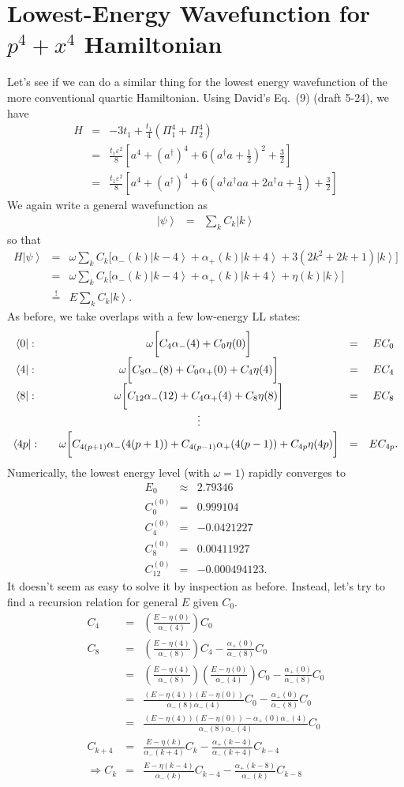 \documentclass[a4paper, 10pt]{paper}
\newcommand{\be}{\begin{eqnarray*}}
\newcommand{\ee}{\end{eqnarray*}}
\newcommand{\ket}[1]{\left|{#1}\right\rangle}
\newcommand{\bra}[1]{\left\langle{#1}\right|}
\begin{document}
\section{Lowest-Energy Wavefunction for $p^4+x^4$ Hamiltonian}
Let's see if we can do a similar thing for the lowest energy wavefunction of the more conventional quartic Hamiltonian. Using David's Eq.~(9) (draft 5-24), we have
\be
H&=&-3t_1+\frac{t_1}{4}\left(\Pi_1^4+\Pi_2^4\right)\\
&=&\frac{t_1\varepsilon^2}{8}\left[a^4+\left(a^\dagger\right)^4+6\left(a^\dagger a+\frac{1}{2}\right)^2+\frac{3}{2}\right]\\
&=&\frac{t_1\varepsilon^2}{8}\left[a^4+\left(a^\dagger\right)^4+6\left(a^\dagger a^\dagger a a +2a^\dagger a+\frac{1}{4}\right)+\frac{3}{2}\right]
\ee
We again write a general wavefunction as
\be
\ket{\psi}&=&\sum_kC_k\ket{k}
\ee
so that
\be
H\ket{\psi}&=&\omega\sum_{k}C_k\bigg[\alpha_-(k)\ket{k-4}+\alpha_+(k)\ket{k+4}+3\left(2k^2+2k+1\right)\ket{k}\bigg]\\
&=&\omega\sum_{k}C_k\bigg[\alpha_-(k)\ket{k-4}+\alpha_+(k)\ket{k+4}+\eta(k)\ket{k}\bigg]\\
&\stackrel{!}{=}&E\sum_kC_k\ket{k}.
\ee
As before, we take overlaps with a few low-energy LL states:
\be
\renewcommand\arraystretch{1.5}\begin{array}{ccccc}
\bra{0}:&&\omega\bigg[C_{4}\alpha_-(4)+C_{0}\eta(0)\bigg]&=&EC_0\\
\bra{4}:&&\omega\bigg[C_{8}\alpha_-(8)+C_{0}\alpha_+(0)+C_{4}\eta(4)\bigg]&=&EC_4\\
\bra{8}:&&\omega\bigg[C_{12}\alpha_-(12)+C_{4}\alpha_+(4)+C_{8}\eta(8)\bigg]&=&EC_8\\
&&\vdots && \\
\bra{4p}:&&\omega\bigg[C_{4(p+1)}\alpha_-(4(p+1))+C_{4(p-1)}\alpha_+(4(p-1))+C_{4p}\eta(4p)\bigg]&=&EC_{4p}.
\end{array}
\ee
Numerically, the lowest energy level (with $\omega=1$) rapidly converges to
\be
E_0&\approx&2.79346\\
C^{(0)}_0&=&0.999104\\
C^{(0)}_4&=&-0.0421227\\
C^{(0)}_8&=&0.00411927\\
C^{(0)}_12&=&-0.000494123.
\ee
It doesn't seem as easy to solve it by inspection as before. Instead, let's try to find a recursion relation for general $E$ given $C_0$.
\be
C_4&=&\left(\frac{E-\eta(0)}{\alpha_-(4)}\right)C_0\\
C_8&=&\left(\frac{E-\eta(4)}{\alpha_-(8)}\right)C_4-\frac{\alpha_+(0)}{\alpha_-(8)}C_0\\
&=&\left(\frac{E-\eta(4)}{\alpha_-(8)}\right)\left(\frac{E-\eta(0)}{\alpha_-(4)}\right)C_0-\frac{\alpha_+(0)}{\alpha_-(8)}C_0\\
&=&\frac{\left(E-\eta(4)\right)\left(E-\eta(0)\right)}{\alpha_-(8)\alpha_-(4)}C_0-\frac{\alpha_+(0)}{\alpha_-(8)}C_0\\
&=&\frac{\left(E-\eta(4)\right)\left(E-\eta(0)\right)-\alpha_+(0)\alpha_-(4)}{\alpha_-(8)\alpha_-(4)}C_0\\
C_{k+4}&=&\frac{E-\eta(k)}{\alpha_-(k+4)}C_k-\frac{\alpha_+(k-4)}{\alpha_-(k+4)}C_{k-4}\\
\Rightarrow C_{k}&=&\frac{E-\eta(k-4)}{\alpha_-(k)}C_{k-4}-\frac{\alpha_+(k-8)}{\alpha_-(k)}C_{k-8}
\ee
\end{document}

